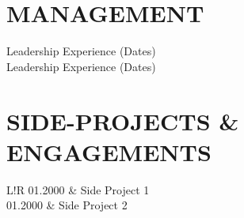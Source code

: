 \documentclass[10pt,a4paper]{article}
\newcommand\VRule{\color{lightgray}\vrule width 0.5pt} %
\begin{document}
\section*{\textbf{MANAGEMENT}}

Leadership Experience (Dates)\\
Leadership Experience (Dates)

\section*{\textbf{SIDE-PROJECTS \& ENGAGEMENTS}}
\begin{tabular}{L!{\VRule}R}
01.2000 & Side Project 1\\
01.2000 & Side Project 2\\

\end{tabular}
\end{document}
